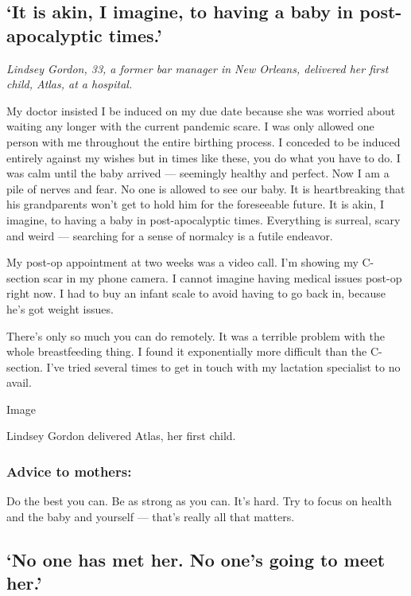 \hypertarget{it-is-akin-i-imagine-to-having-a-baby-in-post-apocalyptic-times}{%
\subsection{`It is akin, I imagine, to having a baby in post-apocalyptic
times.'}\label{it-is-akin-i-imagine-to-having-a-baby-in-post-apocalyptic-times}}

\emph{Lindsey Gordon, 33, a former bar manager in New Orleans, delivered
her first child, Atlas, at a hospital.}

My doctor insisted I be induced on my due date because she was worried
about waiting any longer with the current pandemic scare. I was only
allowed one person with me throughout the entire birthing process. I
conceded to be induced entirely against my wishes but in times like
these, you do what you have to do. I was calm until the baby arrived ---
seemingly healthy and perfect. Now I am a pile of nerves and fear. No
one is allowed to see our baby. It is heartbreaking that his
grandparents won't get to hold him for the foreseeable future. It is
akin, I imagine, to having a baby in post-apocalyptic times. Everything
is surreal, scary and weird --- searching for a sense of normalcy is a
futile endeavor.

My post-op appointment at two weeks was a video call. I'm showing my
C-section scar in my phone camera. I cannot imagine having medical
issues post-op right now. I had to buy an infant scale to avoid having
to go back in, because he's got weight issues.

There's only so much you can do remotely. It was a terrible problem with
the whole breastfeeding thing. I found it exponentially more difficult
than the C-section. I've tried several times to get in touch with my
lactation specialist to no avail.

Image

Lindsey Gordon delivered Atlas, her first child.

\hypertarget{advice-to-mothers-3}{%
\subsubsection{\texorpdfstring{\textbf{Advice to
mothers:}}{Advice to mothers:}}\label{advice-to-mothers-3}}

Do the best you can. Be as strong as you can. It's hard. Try to focus on
health and the baby and yourself --- that's really all that matters.

\hypertarget{no-one-has-met-her-no-ones-going-to-meet-her}{%
\subsection{`No one has met her. No one's going to meet
her.'}\label{no-one-has-met-her-no-ones-going-to-meet-her}}

